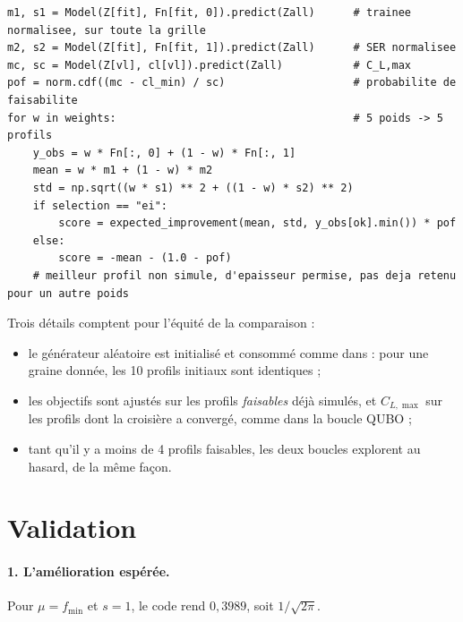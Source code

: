 \begin{codebox}
\begin{lstlisting}
m1, s1 = Model(Z[fit], Fn[fit, 0]).predict(Zall)      # trainee normalisee, sur toute la grille
m2, s2 = Model(Z[fit], Fn[fit, 1]).predict(Zall)      # SER normalisee
mc, sc = Model(Z[vl], cl[vl]).predict(Zall)           # C_L,max
pof = norm.cdf((mc - cl_min) / sc)                    # probabilite de faisabilite
for w in weights:                                     # 5 poids -> 5 profils
    y_obs = w * Fn[:, 0] + (1 - w) * Fn[:, 1]
    mean = w * m1 + (1 - w) * m2
    std = np.sqrt((w * s1) ** 2 + ((1 - w) * s2) ** 2)
    if selection == "ei":
        score = expected_improvement(mean, std, y_obs[ok].min()) * pof
    else:
        score = -mean - (1.0 - pof)
    # meilleur profil non simule, d'epaisseur permise, pas deja retenu pour un autre poids
\end{lstlisting}
\end{codebox}

Trois détails comptent pour l'équité de la comparaison :
\begin{itemize}
\item le générateur aléatoire est initialisé et consommé comme dans  : pour une graine donnée, les 10 profils initiaux sont identiques ;
\item les objectifs sont ajustés sur les profils \emph{faisables} déjà simulés, et $C_{L,\max}$ sur les profils dont la croisière a convergé, comme dans la boucle QUBO ;
\item tant qu'il y a moins de 4 profils faisables, les deux boucles explorent au hasard, de la même façon.
\end{itemize}

\section{Validation}
\paragraph{1. L'amélioration espérée.} Pour $\mu=f_{\min}$ et $s=1$, le code rend $0{,}3989$, soit $1/\sqrt{2\pi}$.


